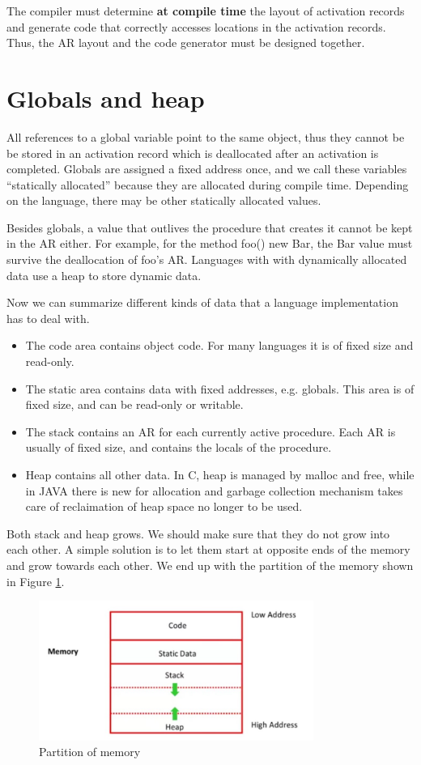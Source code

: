 The compiler must determine \textbf{at compile time} the layout of activation records and generate code that correctly accesses locations in the activation records. Thus, the AR layout and the code generator must be designed together.
\section{Globals and heap}
All references to a global variable point to the same object, thus they cannot be be stored in an activation record which is deallocated after an activation is completed. Globals are assigned a fixed address once, and we call these variables ``statically allocated'' because they are allocated during compile time. Depending on the language, there may be other statically allocated values.

Besides globals, a value that outlives the procedure that creates it cannot be kept in the AR either. For example, for the method \textsf{foo() {new Bar}}, the Bar value must survive the deallocation of foo's AR. Languages with with dynamically allocated data use a heap to store dynamic data. 

Now we can summarize different kinds of data that a language implementation has to deal with. 
\begin{itemize}
\item The code area contains object code. For many languages it is of fixed size and read-only.
\item The static area contains data with fixed addresses, e.g. globals. This area is of fixed size, and can be read-only or writable.
\item The stack contains an AR for each currently active procedure. Each AR is usually of fixed size, and contains the locals of the procedure.
\item Heap contains all other data. In C, heap is managed by \textsf{malloc} and \textsf{free}, while in JAVA there is \textsf{new} for allocation and garbage collection mechanism takes care of reclaimation of heap space no longer to be used.
\end{itemize}
Both stack and heap grows. We should make sure that they do not grow into each other. A simple solution is to let them start at opposite ends of the memory and grow towards each other. We end up with the partition of the memory shown in Figure \ref{mempart}. 
\begin{figure}[ht]
\centering
\includegraphics[width = 0.8\textwidth]{memory.jpg}
\caption{Partition of memory}\label{mempart}
\end{figure}
